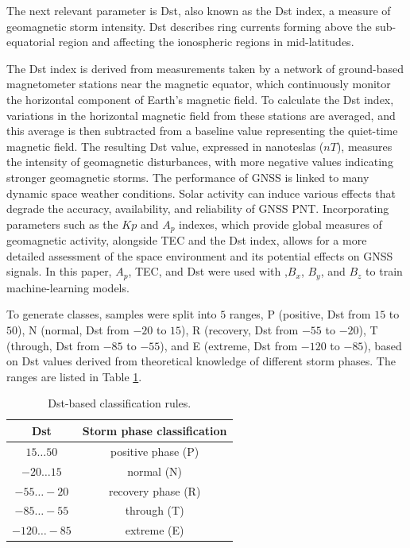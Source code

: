 \documentclass[sn-mathphys-num]{sn-jnl}%
\begin{document}
The next relevant parameter is Dst, also known as the Dst index, a measure of geomagnetic storm intensity. Dst describes ring currents forming above the sub-equatorial region and affecting the ionospheric regions in mid-latitudes.

The Dst index is derived from measurements taken by a network of ground-based magnetometer stations near the magnetic equator, which continuously monitor the horizontal component of Earth's magnetic field. To calculate the Dst index, variations in the horizontal magnetic field from these stations are averaged, and this average is then subtracted from a baseline value representing the quiet-time magnetic field. The resulting Dst value, expressed in nanoteslas ($nT$), measures the intensity of geomagnetic disturbances, with more negative values indicating stronger geomagnetic storms. The performance of GNSS is linked to many dynamic space weather conditions. Solar activity can induce various effects that degrade the accuracy, availability, and reliability of GNSS PNT. Incorporating parameters such as the $Kp$ and $A_p$ indexes, which provide global measures of geomagnetic activity, alongside TEC and the Dst index, allows for a more detailed assessment of the space environment and its potential effects on GNSS signals. In this paper, $A_p$, TEC, and Dst were used with ,$B_x$, $B_y$, and $B_z$ to train machine-learning models.

To generate classes, samples were split into $5$ ranges, P (positive, Dst from $15$ to $50$), N (normal, Dst from $-20$ to $15$), R (recovery, Dst from $-55$ to $-20$), T (through, Dst from $-85$ to $-55$), and E (extreme, Dst from $-120$ to $-85$), based on Dst values derived from theoretical knowledge of different storm phases. The ranges are listed in Table \ref{tab:Dstranges}.

\begin{table}[!ht]
    \centering
    \caption{Dst-based classification rules.}
    \label{tab:Dstranges}
    \begin{tabular}{|c|c|}
        \hline
        Dst & Storm phase classification \\ \hline
        $15\dots50$ & positive phase (P) \\ \hline
        $-20\dots15$ & normal (N) \\ \hline
        $-55\dots-20$ & recovery phase (R) \\ \hline
        $-85\dots-55$ & through (T) \\ \hline
        $-120\dots-85$ & extreme (E) \\ \hline
    \end{tabular}
\end{table}
\end{document}
